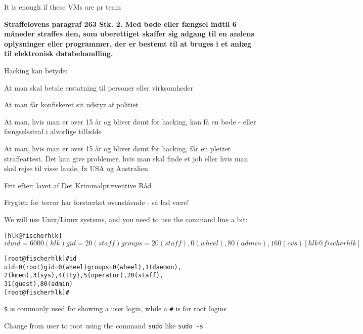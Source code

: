 \documentclass[Screen16to9,17pt]{foils}
\begin{document}
\centerline{It is enough if these VMs are pr team}


\vskip 1cm
{\bfseries Straffelovens paragraf 263 Stk. 2. Med bøde eller fængsel
  indtil 6 måneder
straffes den, som uberettiget skaffer sig adgang til en andens
oplysninger eller programmer, der er bestemt til at bruges i et anlæg
til elektronisk databehandling.}

Hacking kan betyde:
\begin{list2}
\item At man skal betale erstatning til personer eller virksomheder
\item At man får konfiskeret sit udstyr af politiet
\item At man, hvis man er over 15 år og bliver dømt for hacking, kan
  få en bøde - eller fængselsstraf i alvorlige tilfælde
\item At man, hvis man er over 15 år og bliver dømt for hacking, får
en plettet straffeattest. Det kan give problemer, hvis man skal finde
et job eller hvis man skal rejse til visse lande, fx USA og
Australien
\item Frit efter:  lavet af Det
  Kriminalpræventive Råd
\item Frygten for terror har forstærket ovenstående - så lad være!
\end{list2}







We will use Unix/Linux systems, and you need to use the command line a bit:

\begin{alltt}
\small
[hlk@fischer hlk]$ id
uid=6000(hlk) gid=20(staff) groups=20(staff),
0(wheel), 80(admin), 160(cvs)
[hlk@fischer hlk]$

[root@fischer hlk]# id
uid=0(root) gid=0(wheel) groups=0(wheel), 1(daemon),
2(kmem), 3(sys), 4(tty), 5(operator), 20(staff),
31(guest), 80(admin)
[root@fischer hlk]#
\end{alltt}

\begin{list1}
\item \verb+$+ is commonly used for showing a user login, while a \verb+#+ is for root logins
\item Change from user to root using the command \verb+sudo+ like \verb+sudo -s+
\end{list1}
\end{document}
